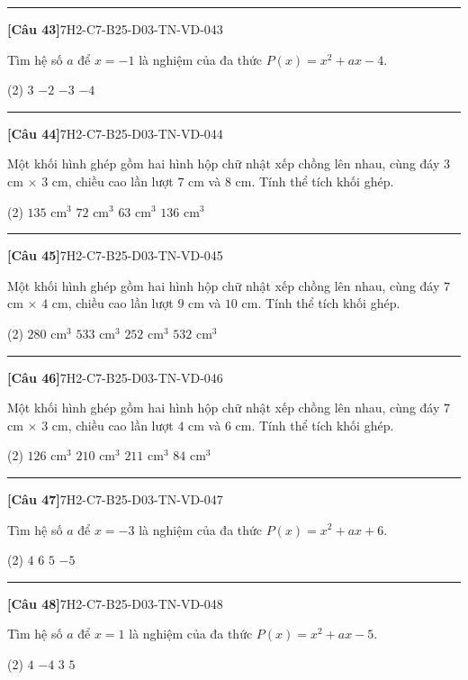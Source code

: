 \documentclass[12pt,a4paper]{article}
\newif\ifloigiai
\newenvironment{cauhoi}[2]{%
  \par\medskip\noindent\rule{\textwidth}{0.4pt}\par\nopagebreak
  \noindent\textbf{[#1]}\hfill{\scriptsize\ttfamily #2}\par\nopagebreak\smallskip}{\par}
\newcommand{\dapan}[1]{\ifloigiai\par\smallskip\noindent\textit{Đáp án:} \textbf{#1}\par\fi}
\begin{document}
\begin{cauhoi}{Câu 43}{7H2-C7-B25-D03-TN-VD-043}
Tìm hệ số $a$ để $x=-1$ là nghiệm của đa thức $P(x)=x^{2}+ax-4$.
\begin{tasks}(2)
\task $3$
\task $-2$
\task $-3$
\task $-4$
\end{tasks}
\dapan{C}
\end{cauhoi}
\begin{cauhoi}{Câu 44}{7H2-C7-B25-D03-TN-VD-044}
Một khối hình ghép gồm hai hình hộp chữ nhật xếp chồng lên nhau, cùng đáy $3$ cm $\times$ $3$ cm, chiều cao lần lượt $7$ cm và $8$ cm. Tính thể tích khối ghép.
\begin{tasks}(2)
\task $135\text{ cm}^3$
\task $72\text{ cm}^3$
\task $63\text{ cm}^3$
\task $136\text{ cm}^3$
\end{tasks}
\dapan{A}
\end{cauhoi}
\begin{cauhoi}{Câu 45}{7H2-C7-B25-D03-TN-VD-045}
Một khối hình ghép gồm hai hình hộp chữ nhật xếp chồng lên nhau, cùng đáy $7$ cm $\times$ $4$ cm, chiều cao lần lượt $9$ cm và $10$ cm. Tính thể tích khối ghép.
\begin{tasks}(2)
\task $280\text{ cm}^3$
\task $533\text{ cm}^3$
\task $252\text{ cm}^3$
\task $532\text{ cm}^3$
\end{tasks}
\dapan{D}
\end{cauhoi}
\begin{cauhoi}{Câu 46}{7H2-C7-B25-D03-TN-VD-046}
Một khối hình ghép gồm hai hình hộp chữ nhật xếp chồng lên nhau, cùng đáy $7$ cm $\times$ $3$ cm, chiều cao lần lượt $4$ cm và $6$ cm. Tính thể tích khối ghép.
\begin{tasks}(2)
\task $126\text{ cm}^3$
\task $210\text{ cm}^3$
\task $211\text{ cm}^3$
\task $84\text{ cm}^3$
\end{tasks}
\dapan{B}
\end{cauhoi}
\begin{cauhoi}{Câu 47}{7H2-C7-B25-D03-TN-VD-047}
Tìm hệ số $a$ để $x=-3$ là nghiệm của đa thức $P(x)=x^{2}+ax+6$.
\begin{tasks}(2)
\task $4$
\task $6$
\task $5$
\task $-5$
\end{tasks}
\dapan{C}
\end{cauhoi}
\begin{cauhoi}{Câu 48}{7H2-C7-B25-D03-TN-VD-048}
Tìm hệ số $a$ để $x=1$ là nghiệm của đa thức $P(x)=x^{2}+ax-5$.
\begin{tasks}(2)
\task $4$
\task $-4$
\task $3$
\task $5$
\end{tasks}
\dapan{A}
\end{cauhoi}
\end{document}
